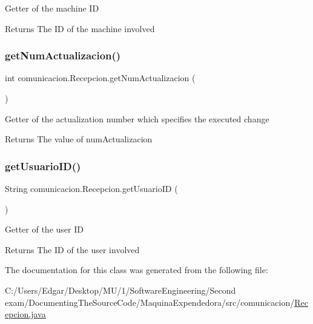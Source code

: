Getter of the machine ID \begin{DoxyReturn}{Returns}
The ID of the machine involved 
\end{DoxyReturn}
\mbox{\label{classcomunicacion_1_1_recepcion_afa39bd7c5b7b749cb28eb948ee130441}} 
\subsubsection{\texorpdfstring{get\+Num\+Actualizacion()}{getNumActualizacion()}}
{\footnotesize\ttfamily int comunicacion.\+Recepcion.\+get\+Num\+Actualizacion (\begin{DoxyParamCaption}{ }\end{DoxyParamCaption})\hspace{0.3cm}{\ttfamily [inline]}}

Getter of the actualization number which specifies the executed change \begin{DoxyReturn}{Returns}
The value of num\+Actualizacion 
\end{DoxyReturn}
\mbox{\label{classcomunicacion_1_1_recepcion_a8beb628d06ac82fdde1ee50157c93bc4}} 
\subsubsection{\texorpdfstring{get\+Usuario\+I\+D()}{getUsuarioID()}}
{\footnotesize\ttfamily String comunicacion.\+Recepcion.\+get\+Usuario\+ID (\begin{DoxyParamCaption}{ }\end{DoxyParamCaption})\hspace{0.3cm}{\ttfamily [inline]}}

Getter of the user ID \begin{DoxyReturn}{Returns}
The ID of the user involved 
\end{DoxyReturn}


The documentation for this class was generated from the following file\+:\begin{DoxyCompactItemize}
\item 
C\+:/\+Users/\+Edgar/\+Desktop/\+M\+U/1/\+Software\+Engineering/\+Second exam/\+Documenting\+The\+Source\+Code/\+Maquina\+Expendedora/src/comunicacion/\mbox{\hyperlink{_recepcion_8java}{Recepcion.\+java}}\end{DoxyCompactItemize}
